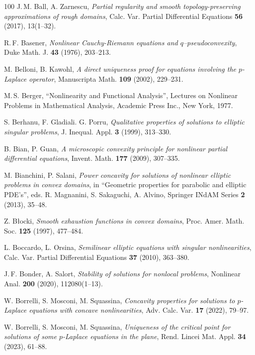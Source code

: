 \documentclass[11pt, reqno]{amsart}
\theoremstyle{definition}
\numberwithin{equation}{section}
\begin{document}
\begin{thebibliography}{100}
 J.$\,$M. Ball, A. Zarnescu,
\emph{Partial regularity and smooth topology-preserving approximations of rough domains},
Calc. Var. Partial Differential Equations \textbf{56} (2017), %
13(1--32).

 R.$\,$F. Basener,
\emph{Nonlinear Cauchy-Riemann equations and $q$--pseudoconvexity}, 
Duke Math. J. \textbf{43} (1976), %
203--213.

 M. Belloni, B. Kawohl,
\emph{A direct uniqueness proof for equations involving the $p$-Laplace operator},
Manuscripta Math. \textbf{109} (2002), %
229--231.

 M.$\,$S. Berger,
``Nonlinearity and Functional Analysis'', 
Lectures on Nonlinear Problems in Mathematical Analysis, Academic Press Inc., New York, 1977.

 S. Berhanu, F. Gladiali. G. Porru,
\emph{Qualitative properties of solutions to elliptic singular problems},
J. Inequal. Appl. \textbf{3} (1999), %
313--330.

 B. Bian, P. Guan, 
\emph{A microscopic convexity principle for nonlinear partial differential equations},
Invent. Math. \textbf{177} (2009), %
307--335.

 M. Bianchini, P. Salani, 
\emph{Power concavity for solutions of nonlinear elliptic problems in convex domains},
in ``Geometric properties for parabolic and elliptic PDE’s'', eds. R. Magnanini, S. Sakaguchi, A. Alvino, Springer INdAM Series \textbf{2} (2013), %
35--48.

 Z. Błocki,
\emph{Smooth exhaustion functions in convex domains},
Proc. Amer. Math. Soc. \textbf{125} (1997), %
477--484. 

 L. Boccardo, L. Orsina,
\emph{Semilinear elliptic equations with singular nonlinearities},
Calc. Var. Partial Differential Equations \textbf{37} (2010), %
363--380.

 J.$\,$F. Bonder, A. Salort,
\emph{Stability of solutions for nonlocal problems},
Nonlinear Anal. \textbf{200} (2020), %
112080(1--13).

 W. Borrelli, S. Mosconi, M. Squassina,
\emph{Concavity properties for solutions to $p$-Laplace equations with concave nonlinearities},
Adv. Calc. Var. \textbf{17} (2022), %
79--97.

 W. Borrelli, S. Mosconi, M. Squassina,
\emph{Uniqueness of the critical point for solutions of some $p$-Laplace equations in the plane},
Rend. Lincei Mat. Appl. \textbf{34} (2023), %
61--88.


\end{thebibliography}
\end{document}
